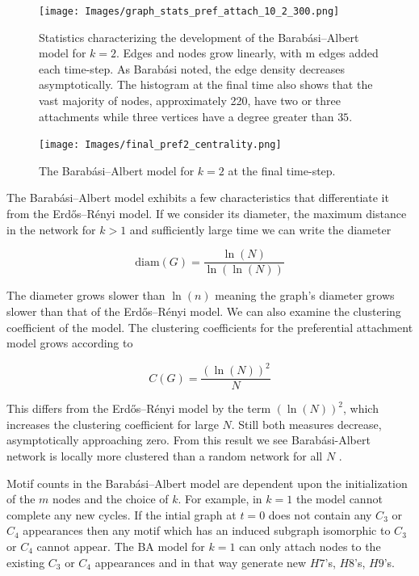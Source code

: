 \begin{figure}[h!]
    \texttt{[image: Images/graph\_stats\_pref\_attach\_10\_2\_300.png]}
    \centering
    \caption{Statistics characterizing the development of the Barabási–Albert model for $k=2$.
    Edges and nodes grow linearly, with m edges added each time-step. As Barabási noted, the edge density decreases asymptotically. The histogram at
    the final time also shows that the vast majority of nodes, approximately 220, have two or three attachments
    while three vertices have a degree greater than $35$.}
\end{figure}

\begin{figure}
    \texttt{[image: Images/final\_pref2\_centrality.png]}
    \centering
    \caption{The Barabási–Albert model for $k=2$ at the final time-step.}
\end{figure}

The Barabási–Albert model exhibits a few characteristics that differentiate it from the 
Erdős–Rényi model. If we consider its diameter, the maximum distance in the network
for $k>1$ and sufficiently large time we can write the diameter 

$$\text{diam}(G) = \frac{\ln(N)}{\ln(\ln (N))}$$

The diameter grows slower than $\ln(n)$ meaning the graph's diameter grows slower than that of the 
Erdős–Rényi model. We can also examine the clustering coefficient of the model. 
The clustering coefficients for the preferential attachment model grows according to \cite{klemm_2002}

$$
C(G) = \frac{(\ln (N))^2}{N}
$$

This differs from the Erdős–Rényi model by the term $(\ln (N))^2$,
which increases the clustering coefficient for large $N$. Still both measures
decrease, asymptotically approaching zero. 
From this result we see Barabási-Albert network is locally more clustered than a random network for all $N$ \cite{barabasi2016network}.

Motif counts in the Barabási–Albert model are dependent upon the initialization of the $m$ nodes 
and the choice of $k$. For example, in $k=1$ the model cannot complete any new cycles. If the
intial graph at $t=0$ does not contain any $C_3$ or $C_4$ appearances then any motif 
which has an induced subgraph isomorphic to $C_3$ or $C_4$ cannot appear. The BA model 
for $k=1$ can only attach nodes to the existing  $C_3$ or $C_4$ appearances and in that 
way generate new $H7$'s, $H8$'s, $H9$'s. 

